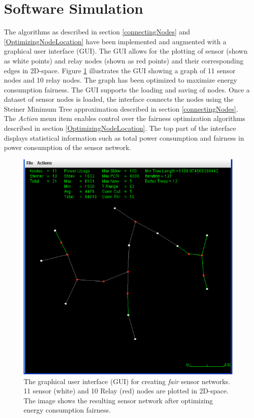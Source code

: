 \section{Software Simulation}

The algorithms as described in section \ref{connectingNodes} and \ref{OptimizingNodeLocation} have been implemented and augmented with a graphical user interface (GUI). The GUI allows for the plotting of sensor (shown as white points) and relay nodes (shown as red points) and their corresponding edges in 2D-space. Figure \ref{gui} illustrates the GUI showing a graph of 11 sensor nodes and 10 relay nodes. The graph has been optimized to maximize energy consumption fairness. The GUI supports the loading and saving of nodes. Once a dataset of sensor nodes is loaded, the interface connects the nodes using the Steiner Minimum Tree approximation described in section \ref{connectingNodes}. The \textit{Action} menu item enables control over the fairness optimization algorithms described in section \ref{OptimizingNodeLocation}. The top part of the interface displays statistical information such as total power consumption and fairness in power consumption of the sensor network.

\begin{figure}[htp]
\includegraphics[scale=0.405]{images/graphical-interface.PNG}
\caption{The graphical user interface (GUI) for creating \textit{fair} sensor networks. 11 sensor (white) and 10 Relay (red) nodes are plotted in 2D-space. The image shows the resulting sensor network after optimizing energy consumption fairness.}
\label{gui}
\end{figure}